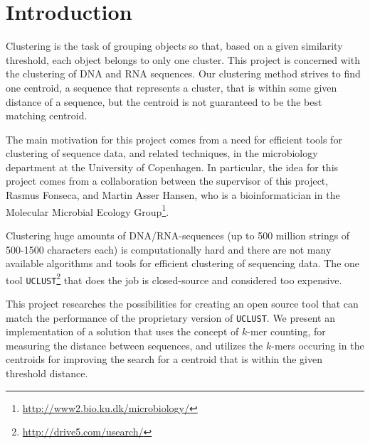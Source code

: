 \section{Introduction}
Clustering is the task of grouping objects so that, based on a given similarity
threshold, each object belongs to only one cluster.  This project is concerned
with the clustering of DNA and RNA sequences. Our clustering method strives to
find one centroid, a sequence that represents a cluster, that is within some
given distance of a sequence, but the centroid is not guaranteed to be the best
matching centroid.

The main motivation for this project comes from a need for efficient tools for
clustering of sequence data, and related techniques, in the microbiology
department at the University of Copenhagen. In particular, the idea for this
project comes from a collaboration between the supervisor of this project,
Rasmus Fonseca, and Martin Asser Hansen, who is a bioinformatician in the
Molecular Microbial Ecology
Group\footnote{\url{http://www2.bio.ku.dk/microbiology/}}.

Clustering huge amounts of DNA/RNA-sequences (up to 500 million strings of
500-1500 characters each) is computationally hard and there are not many
available algorithms and tools for efficient clustering of sequencing data. The
one tool \texttt{UCLUST}\footnote{\url{http://drive5.com/usearch/}} that does
the job is closed-source and considered too expensive.

This project researches the possibilities for creating an open source tool that
can match the performance of the proprietary version of \texttt{UCLUST}. We
present an implementation of a solution that uses the concept of $k$-mer
counting, for measuring the distance between sequences, and utilizes the
$k$-mers occuring in the centroids for improving the search for a centroid that
is within the given threshold distance.
